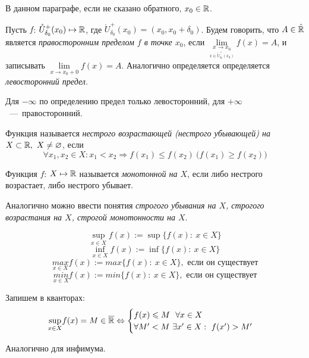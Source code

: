 В данном параграфе, если не сказано обратного, $x_{0} \in \mathbb{R}$.

\begin{definition}
    Пусть $f$: $\mathring{U}^{+}_{\delta_{0}} (x_{0})  \mapsto \mathbb{R}$, где $\mathring{U}^{+}_{\delta_{0}} (x_{0}) = (x_{0}, x_{0} + \delta_{0})$.
    Будем говорить, что $A\in \Hat{\mathbb{R}}$ является \textit{правосторонним пределом $f$ в точке $x_{0}$}, если $ \lim\limits_{\underset{x \in \mathring{U}^+_{\delta_0} (x_0) }{x\to x_0}} f (x) = A$, и записывать $\lim\limits_{x \to x_{0} +0} f(x) = A$. Аналогично определяется определяется \textit{левосторонний предел}.
\end{definition}
\begin{note}
    Для $-\infty$ по определению предел только левосторонний, для $+\infty$~---~правосторонний.
\end{note}
\begin{definition}
    Функция называется \textit{нестрого возрастающей (нестрого убывающей) на $X \subset \mathbb{R},\  X \neq \varnothing$}, если 
    $$\forall x_{1}, x_{2} \in X: x_{1} < x_{2} \Rightarrow f(x_{1}) \leq f(x_{2}) \ \bigg(f(x_{1}) \geq f(x_{2}) \bigg)$$
\end{definition}

\begin{definition}
    Функция $f$: $X \mapsto \mathbb{R}$ называется \textit{монотонной на $X$}, если либо нестрого возрастает, либо нестрого убывает.    
\end{definition}

\begin{definition}
    Аналогично можно ввести понятия \textit{строгого убывания на $X$, строгого возрастания на $X$, строгой монотонности на $X$}.
\end{definition}

\begin{definition}
    $$\underset{x \in X}{\sup} f(x) := \sup\{ f(x): \ x \in X\}$$
    $$\underset{x \in X}{\inf} f(x) := \inf \{ f(x): \ x \in X\}$$
    $$\underset{x \in X}{max} f(x) := max \{ f(x): \ x \in X\}, \text{ если он существует}$$
    $$\underset{x \in X}{min} f(x) := min \{ f(x):\  x \in X\}, \text{ если он существует}$$

   Запишем в кванторах: 
    $$\underset{x \in X}{\sup} f(x) = M \in \overline{\mathbb{R}} \Leftrightarrow 
    \begin{cases}
        f(x) \leqslant M \ \ \forall x\in X\\
        \forall M' < M \ \exists x' \in X: \ f(x') > M'
    \end{cases}$$

    Аналогично для инфимума.

\end{definition}

